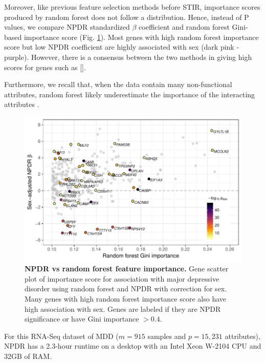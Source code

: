 \documentclass[10pt]{article}
\begin{document}
Moreover, like previous feature selection methods before STIR, importance scores produced by random forest does not follow a distribution.
Hence, instead of P values, we compare NPDR standardized $\beta$ coefficient and random forest Gini-based importance score (Fig. \ref{fig:npdr_rf_mdd}).
Most genes with high random forest importance score but low NPDR coefficient are highly associated with sex (dark pink - purple).
However, there is a consensus between the two methods in giving high scores for genes such as [].

Furthermore, we recall that, when the data contain many non-functional attributes, random forest likely underestimate the importance of the interacting attributes \cite{mckinney2009capturing,winham2012snp}.


\begin{figure}[!tpb]%
\centerline{\includegraphics[]{../figs/mostafavi_npdr_rf_mdd.pdf}}
\caption{{\bf NPDR vs random forest feature importance.}
Gene scatter plot of importance score for association with major depressive disorder using random forest and NPDR with correction for sex. Many genes with high random forest importance score also have high association with sex. Genes are labeled if they are NPDR significance or have Gini importance $>0.4$.}
\label{fig:npdr_rf_mdd}
\end{figure}

For this RNA-Seq dataset of MDD ($m=915$ samples and $p=15,231$ attributes), NPDR has a 2.3-hour runtime on a desktop with an Intel Xeon W-2104 CPU and 32GB of RAM. 
\end{document}
